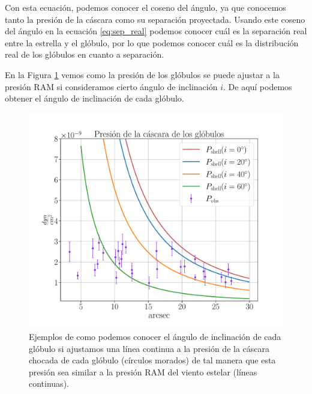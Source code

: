 \documentclass{book}
\begin{document}
Con esta ecuación, podemos conocer el coseno del ángulo, ya que conocemos tanto la presión de la cáscara como su separación proyectada. Usando este coseno del ángulo en la ecuación \ref{eq:sep_real} podemos conocer cuál es la separación real entre la estrella y el glóbulo, por lo que podemos conocer cuál es la distribución real de los glóbulos en cuanto a separación.  

En la Figura \ref{graf_presion_ang} vemos como la presión de los glóbulos se puede ajustar a la presión RAM si consideramos cierto ángulo de inclinación $i$. De aquí podemos obtener el ángulo de inclinación de cada glóbulo.%

\begin{figure}[htb]
    \centering
    \includegraphics[width=\textwidth]{imagenes_corregidas/S_52.pdf}
    \caption{Ejemplos de como podemos conocer el ángulo de inclinación de cada glóbulo si ajustamos una línea continua a la presión de la cáscara chocada de cada glóbulo (círculos morados) de tal manera que esta presión sea similar a la presión RAM del viento estelar (líneas continuas).}
    \label{graf_presion_ang}
\end{figure}
\end{document}
